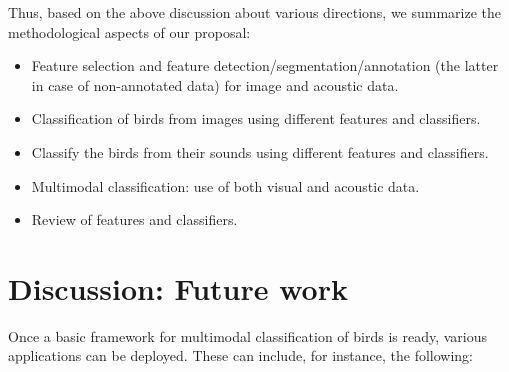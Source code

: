 \documentclass{article}
\begin{document}

Thus, based on the above discussion about various directions, we summarize the
methodological aspects of our proposal: 

\begin{itemize}
	\item Feature selection and feature detection/segmentation/annotation (the latter in case of non-annotated data) 
	for image and acoustic data. 
    \item Classification of birds from images using different features and classifiers.  
    \item Classify the birds from their sounds using different features and classifiers.    
    \item Multimodal classification: use of both visual and acoustic data.
    \item Review of features and classifiers.
\end{itemize}




\section{Discussion: Future work}

Once a basic framework for multimodal classification of birds is ready, various
applications can be deployed. These can include, for instance, the following:
\end{document}
